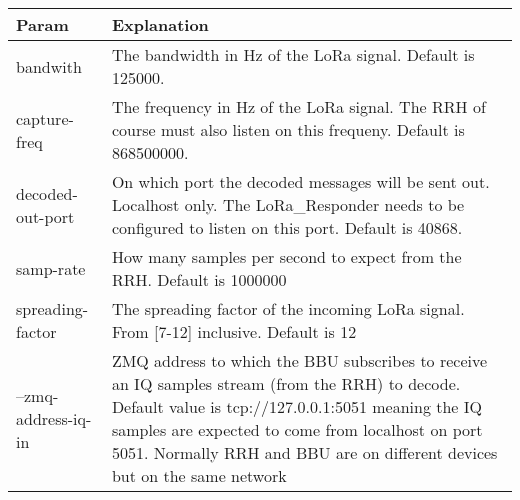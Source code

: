\begin{longtable}[]{@{}ll@{}}
\toprule
\begin{minipage}[b]{0.18\columnwidth}\raggedright\strut
Param\strut
\end{minipage} & \begin{minipage}[b]{0.18\columnwidth}\raggedright\strut
Explanation\strut
\end{minipage}\tabularnewline
\midrule
\endhead
\begin{minipage}[t]{0.18\columnwidth}\raggedright\strut
bandwith\strut
\end{minipage} & \begin{minipage}[t]{0.18\columnwidth}\raggedright\strut
The bandwidth in Hz of the LoRa signal. Default is 125000.\strut
\end{minipage}\tabularnewline
\begin{minipage}[t]{0.18\columnwidth}\raggedright\strut
capture-freq\strut
\end{minipage} & \begin{minipage}[t]{0.18\columnwidth}\raggedright\strut
The frequency in Hz of the LoRa signal. The RRH of course must also
listen on this frequeny. Default is 868500000.\strut
\end{minipage}\tabularnewline
\begin{minipage}[t]{0.18\columnwidth}\raggedright\strut
decoded-out-port\strut
\end{minipage} & \begin{minipage}[t]{0.18\columnwidth}\raggedright\strut
On which port the decoded messages will be sent out. Localhost only. The
LoRa\_Responder needs to be configured to listen on this port. Default
is 40868.\strut
\end{minipage}\tabularnewline
\begin{minipage}[t]{0.18\columnwidth}\raggedright\strut
samp-rate\strut
\end{minipage} & \begin{minipage}[t]{0.18\columnwidth}\raggedright\strut
How many samples per second to expect from the RRH. Default is
1000000\strut
\end{minipage}\tabularnewline
\begin{minipage}[t]{0.18\columnwidth}\raggedright\strut
spreading-factor\strut
\end{minipage} & \begin{minipage}[t]{0.18\columnwidth}\raggedright\strut
The spreading factor of the incoming LoRa signal. From {[}7-12{]}
inclusive. Default is 12\strut
\end{minipage}\tabularnewline
\begin{minipage}[t]{0.18\columnwidth}\raggedright\strut
--zmq-address-iq-in\strut
\end{minipage} & \begin{minipage}[t]{0.18\columnwidth}\raggedright\strut
ZMQ address to which the BBU subscribes to receive an IQ samples stream
(from the RRH) to decode. Default value is tcp://127.0.0.1:5051 meaning
the IQ samples are expected to come from localhost on port 5051.
Normally RRH and BBU are on different devices but on the same
network\strut
\end{minipage}\tabularnewline
\bottomrule
\end{longtable}

